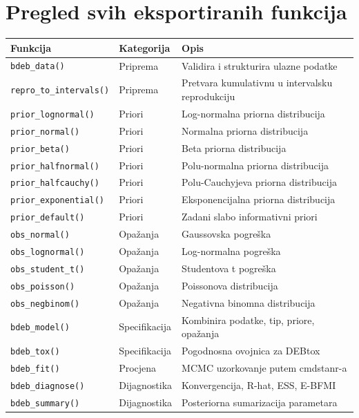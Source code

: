 \documentclass[11pt,a4paper]{article}
\newcommand{\fn}[1]{\texttt{#1()}}
\begin{document}
\section{Pregled svih eksportiranih funkcija}
\label{sec:pregled-funkcija}

\begin{longtable}{lll}
\toprule
\textbf{Funkcija} & \textbf{Kategorija} & \textbf{Opis} \\
\midrule
\endhead
\fn{bdeb\_data} & Priprema & Validira i strukturira ulazne podatke \\
\fn{repro\_to\_intervals} & Priprema & Pretvara kumulativnu u intervalsku reprodukciju \\
\midrule
\fn{prior\_lognormal} & Priori & Log-normalna priorna distribucija \\
\fn{prior\_normal} & Priori & Normalna priorna distribucija \\
\fn{prior\_beta} & Priori & Beta priorna distribucija \\
\fn{prior\_halfnormal} & Priori & Polu-normalna priorna distribucija \\
\fn{prior\_halfcauchy} & Priori & Polu-Cauchyjeva priorna distribucija \\
\fn{prior\_exponential} & Priori & Eksponencijalna priorna distribucija \\
\fn{prior\_default} & Priori & Zadani slabo informativni priori \\
\midrule
\fn{obs\_normal} & Opažanja & Gaussovska pogreška \\
\fn{obs\_lognormal} & Opažanja & Log-normalna pogreška \\
\fn{obs\_student\_t} & Opažanja & Studentova t pogreška \\
\fn{obs\_poisson} & Opažanja & Poissonova distribucija \\
\fn{obs\_negbinom} & Opažanja & Negativna binomna distribucija \\
\midrule
\fn{bdeb\_model} & Specifikacija & Kombinira podatke, tip, priore, opažanja \\
\fn{bdeb\_tox} & Specifikacija & Pogodnosna ovojnica za DEBtox \\
\midrule
\fn{bdeb\_fit} & Procjena & MCMC uzorkovanje putem cmdstanr-a \\
\midrule
\fn{bdeb\_diagnose} & Dijagnostika & Konvergencija, R-hat, ESS, E-BFMI \\
\fn{bdeb\_summary} & Dijagnostika & Posteriorna sumarizacija parametara \\

\end{longtable}
\end{document}
